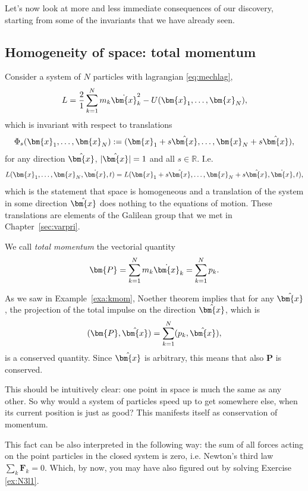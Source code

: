 \documentclass[english,fontsize=11pt,paper=a5,oneside]{scrbook}
\newcommand{\R}{\mathbb{R}}
\newcommand{\bx}{\bm{x}}
\theoremstyle{definition}
\begin{document}
Let's now look at more and less immediate consequences of our discovery, starting from some of the invariants that we have already seen.

\subsection{Homogeneity of space: total momentum}

Consider a system of $N$ particles with lagrangian \eqref{eq:mechlag},
\begin{equation}
    L = \frac21 \sum_{k=1}^N m_k \dot \bx_k^2 - U(\bx_1, \ldots, \bx_N),
\end{equation}
which is invariant with respect to translations
\begin{equation}
    \Phi_s(\bx_1, \ldots, \bx_N) := (\bx_1 + s \hat \bx,\ldots, \bx_N + s \hat \bx),
\end{equation}
for any direction $\hat\bx$, $|\hat\bx|=1$ and all $s\in\R$. I.e.
\begin{equation}
    L(\bx_1, \ldots, \bx_N, \dot \bx, t) = L(\bx_1 + s \hat\bx, \ldots, \bx_N + s \hat\bx, \dot \bx, t),
\end{equation}
which is the statement that space is homogeneous and a translation of the system in some direction $\hat\bx$ does nothing to the equations of motion. These translations are elements of the Galilean group that we met in Chapter~\ref{sec:varpri}.

We call \emph{total momentum} the vectorial quantity
\begin{equation}
    \bm{P} = \sum_{k=1}^N m_k \dot \bx_k = \sum_{k=1}^N p_k.
\end{equation}

As we saw in Example~\ref{exa:kmom}, Noether theorem implies that for any $\hat\bx$, the projection of the total impulse on the direction $\hat\bx$, which is
\begin{equation}
    (\bm{P}, \hat\bx) = \sum_{k=1}^N (p_k, \hat\bx),
\end{equation}
is a conserved quantity.
Since $\hat\bx$ is arbitrary, this means that also $\bm{P}$ is conserved.

This should be intuitively clear: one point in space is much the same as any other. So why would a system of particles speed up to get somewhere else, when its current position is just as good? This manifests itself as conservation of momentum.

This fact can be also interpreted in the following way: the sum of all forces acting on the point particles in the closed system is zero, i.e. Newton's third law $\sum_k \bm{F}_k = 0$. Which, by now, you may have also figured out by solving Exercise \ref{ex:N3l1}.
\end{document}
